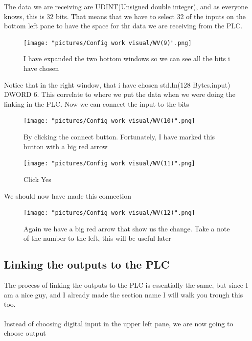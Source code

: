 \documentclass{article}
\begin{document}
\newpage

The data we are receiving are UDINT(Unsigned double integer), and as everyone knows, this is 32 bits. That means that we have to select 32 of the inputs on the bottom left pane to have the space for thr data we are receiving from the PLC. 

\begin{figure}[!h]
    \centering
    \texttt{[image: "pictures/Config work visual/WV(9)".png]}
    \caption{I have expanded the two bottom windows so we can see all the bits i have chosen}
   
\end{figure}

Notice that in the right window, that i have chosen std.In(128 Bytes.input) DWORD 6. This correlate to where we put the data when we were doing the linking in the PLC.
\newpage
Now we can connect the input to the bits


\begin{figure}[!h]
    \centering
    \texttt{[image: "pictures/Config work visual/WV(10)".png]}
    \caption{By clicking the connect button. Fortunately, I have marked this button with a big red arrow}
   
\end{figure}



\begin{figure}[!h]
    \centering
    \texttt{[image: "pictures/Config work visual/WV(11)".png]}
    \caption{Click Yes}
   
\end{figure}

\newpage

We should now have made this connection
\begin{figure}[!h]
    \centering
    \texttt{[image: "pictures/Config work visual/WV(12)".png]}
    \caption{Again we have a big red arrow that show us the change. Take a note of the number to the left, this will be useful later}
    
\end{figure}

\newpage

\subsection{Linking the outputs to the PLC }

The process of linking the outputs to the PLC is essentially the same, but since I am a nice guy, and I already made the section name  I will walk you trough this too. 
\\\\
Instead of choosing digital input in the upper left pane, we are now going to choose output
\end{document}
